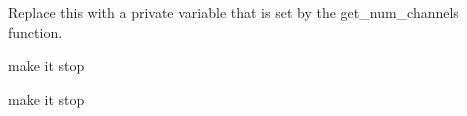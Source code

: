 
\begin{DoxyRefList}
\item[Member \mbox{\hyperlink{class_a_d_s1299___module_aac31dc4f070157739a2c76269cff5fc9}{A\+D\+S1299\+\_\+\+Module::A\+D\+S1299\+\_\+\+Module}} (\mbox{\hyperlink{class_d_a_q___pin___map}{D\+A\+Q\+\_\+\+Pin\+\_\+\+Map}} $\ast$m\+\_\+\+Hardware\+\_\+\+Info)]\label{todo__todo000001}%
%
Replace this with a private variable that is set by the get\+\_\+num\+\_\+channels function. 
\item[Member \mbox{\hyperlink{class_a_d_s1299___module_a698da9251c83e73cf123e7a8ad3f2e55}{A\+D\+S1299\+\_\+\+Module::set\+\_\+conversion\+\_\+mode}} (Conv\+\_\+\+Mode\+\_\+t new\+\_\+state)]\label{todo__todo000004}%
%
make it stop

\label{todo__todo000003}%
%
make it stop
\end{DoxyRefList}